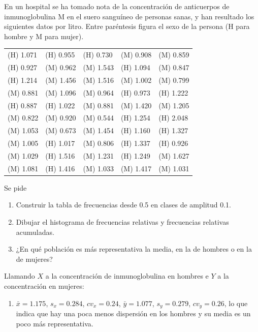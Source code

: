 {En un hospital se ha tomado nota de la concentración de anticuerpos de inmunoglobulina M en el suero sanguíneo de personas sanas, y han resultado los siguientes datos por litro.
Entre paréntesis figura el sexo de la persona (H para hombre y M para mujer).
\begin{center}
\begin{tabular}{lllll}
(H) 1.071 & (H) 0.955 & (H) 0.730 & (M) 0.908 & (M) 0.859  \\
(H) 0.927 & (M) 0.962 & (M) 1.543 & (H) 1.094 & (M) 0.847  \\
(H) 1.214 & (M) 1.456 & (M) 1.516 & (M) 1.002 & (M) 0.799  \\
(M) 0.881 & (M) 1.096 & (M) 0.964 & (H) 0.973 & (H) 1.222  \\
(H) 0.887 & (H) 1.022 & (M) 0.881 & (M) 1.420 & (M) 1.205  \\
(M) 0.822 & (M) 0.920 & (M) 0.544 & (H) 1.254 & (H) 2.048  \\
(M) 1.053 & (M) 0.673 & (M) 1.454 & (H) 1.160 & (H) 1.327  \\
(M) 1.005 & (H) 1.017 & (M) 0.806 & (H) 1.337 & (H) 0.926  \\
(M) 1.029 & (H) 1.516 & (M) 1.231 & (H) 1.249 & (M) 1.627  \\
(M) 1.081 & (H) 1.416 & (M) 1.033 & (M) 1.417 & (M) 1.031  \\
\end{tabular}
\end{center}
Se pide
\begin{enumerate}
\item Construir la tabla de frecuencias desde 0.5 en clases de amplitud 0.1.
\item Dibujar el histograma de frecuencias relativas y frecuencias relativas acumuladas.
\item ¿En qué población es más representativa la media, en la de hombres o en la de mujeres?
\end{enumerate}
}
{Llamando $X$ a la concentración de inmunoglobulina en hombres e $Y$ a la concentración en mujeres:
\begin{enumerate}[start=3]
\item $\bar x = 1.175$, $s_x = 0.284$, $cv_x=0.24$, $\bar y=1.077$, $s_y=0.279$, $cv_y=0.26$, lo que indica que hay una poca menos dispersión en los hombres y su media es un poco más representativa. 
\end{enumerate}
}
{}


